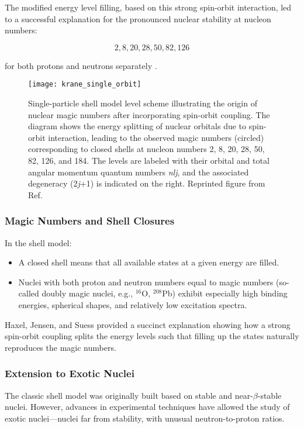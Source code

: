 The modified energy level filling, based on this strong spin-orbit interaction, led to a successful explanation for the pronounced nuclear stability at nucleon numbers:

\[2,8,20,28,50,82,126\]

for both protons and neutrons separately \cite{mayer_shell_1968}.

\begin{figure}
	\centering
	\texttt{[image: krane\_single\_orbit]}
	\caption{Single-particle shell model level scheme illustrating the origin of nuclear magic numbers after incorporating spin-orbit coupling. The diagram shows the energy splitting of nuclear orbitals due to spin-orbit interaction, leading to the observed magic numbers (circled) corresponding to closed shells at nucleon numbers 2, 8, 20, 28, 50, 82, 126, and 184. The levels are labeled with their orbital and total angular momentum quantum numbers \emph{nlj}, and the associated degeneracy (2\emph{j}+1) is indicated on the right. Reprinted figure from Ref. \cite{krane_introductory_1988}}
	\label{fig:magic_numbers}
\end{figure}


\subsubsection{Magic Numbers and Shell Closures}

In the shell model:

\begin{itemize}
	\item A closed shell means that all available states at a given energy are filled.
	\item Nuclei with both proton and neutron numbers equal to magic numbers (so-called doubly magic nuclei, e.g., $^{16}$O, $^{208}$Pb) exhibit especially high binding energies, spherical shapes, and relatively low excitation spectra.
\end{itemize}

Haxel, Jensen, and Suess \cite{haxel_magic_nodate} provided a succinct explanation showing how a strong spin-orbit coupling splits the energy levels such that filling up the states naturally reproduces the magic numbers.


\subsubsection{Extension to Exotic Nuclei}

The classic shell model was originally built based on stable and near-$\beta$-stable nuclei. However, advances in experimental techniques have allowed the study of exotic nuclei—nuclei far from stability, with unusual neutron-to-proton ratios.

